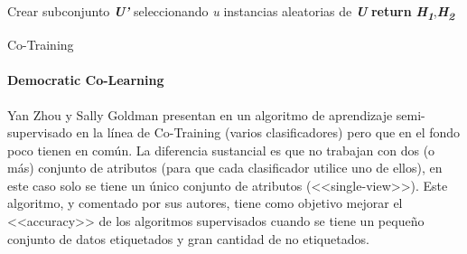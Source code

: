 \begin{algorithm}
    \DontPrintSemicolon
    Crear subconjunto \textbf{\textit{U'}} seleccionando \textit{u} instancias aleatorias de \textbf{\textit{U}}\;
     \textbf{return} \textbf{\textit{H\textsubscript{1}}},\textbf{\textit{H\textsubscript{2}}}
     \caption{Co-Training}\label{pseudo:co-training}
\end{algorithm}

\clearpage
\paragraph{Democratic Co-Learning}

Yan Zhou y Sally Goldman presentan en \cite{zhou2004democratic} un algoritmo de
aprendizaje semi-supervisado en la línea de Co-Training (varios clasificadores)
pero que en el fondo poco tienen en común. La diferencia sustancial es que no
trabajan con dos (o más) conjunto de atributos (para que cada clasificador
utilice uno de ellos), en este caso solo se tiene un único conjunto de atributos
(<<single-view>>). Este algoritmo, y comentado por sus autores, tiene como
objetivo mejorar el <<accuracy>> de los algoritmos supervisados cuando se tiene
un pequeño conjunto de datos etiquetados y gran cantidad de no etiquetados.

